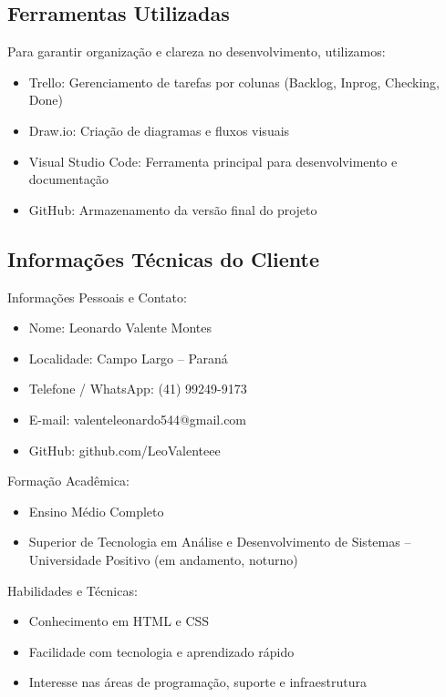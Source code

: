\documentclass[12pt]{article}
\begin{document}
\subsection*{Ferramentas Utilizadas}

Para garantir organização e clareza no desenvolvimento, utilizamos:

\begin{itemize}
    \item Trello: Gerenciamento de tarefas por colunas (Backlog, Inprog, Checking, Done)
    \item Draw.io: Criação de diagramas e fluxos visuais
    \item Visual Studio Code: Ferramenta principal para desenvolvimento e documentação
    \item GitHub: Armazenamento da versão final do projeto
\end{itemize}

\subsection*{Informações Técnicas do Cliente}

Informações Pessoais e Contato:

\begin{itemize}
    \item Nome: Leonardo Valente Montes
    \item Localidade: Campo Largo – Paraná
    \item Telefone / WhatsApp: (41) 99249-9173
    \item E-mail: valenteleonardo544@gmail.com
    \item GitHub: github.com/LeoValenteee
\end{itemize}

Formação Acadêmica:

\begin{itemize}
    \item Ensino Médio Completo
    \item Superior de Tecnologia em Análise e Desenvolvimento de Sistemas – Universidade Positivo (em andamento, noturno)
\end{itemize}

Habilidades e Técnicas:

\begin{itemize}
    \item Conhecimento em HTML e CSS
    \item Facilidade com tecnologia e aprendizado rápido
    \item Interesse nas áreas de programação, suporte e infraestrutura
\end{itemize}
\end{document}
